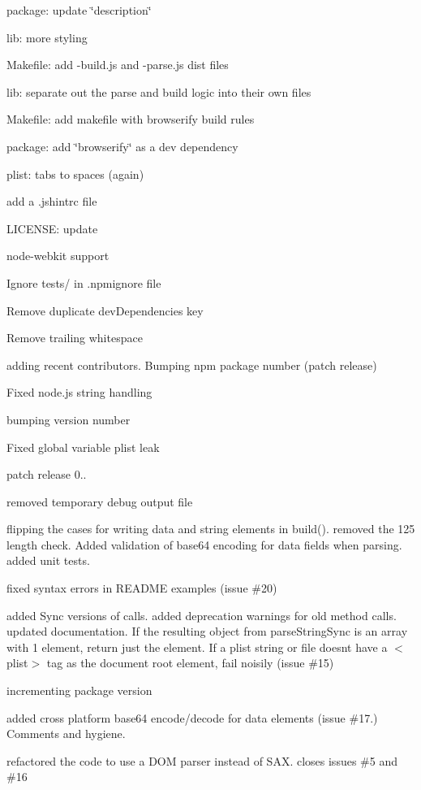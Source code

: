\begin{DoxyItemize}
\item package\+: update \char`\"{}description\char`\"{}
\item lib\+: more styling
\item Makefile\+: add -\/build.\+js and -\/parse.\+js dist files
\item lib\+: separate out the parse and build logic into their own files
\item Makefile\+: add makefile with browserify build rules
\item package\+: add \char`\"{}browserify\char`\"{} as a dev dependency
\item plist\+: tabs to spaces (again)
\item add a .jshintrc file
\item L\+I\+C\+E\+N\+SE\+: update
\item node-\/webkit support
\item Ignore tests/ in .npmignore file
\item Remove duplicate dev\+Dependencies key
\item Remove trailing whitespace
\item adding recent contributors. Bumping npm package number (patch release)
\item Fixed node.\+js string handling
\item bumping version number
\item Fixed global variable plist leak
\item patch release 0..
\item removed temporary debug output file
\item flipping the cases for writing data and string elements in build(). removed the 125 length check. Added validation of base64 encoding for data fields when parsing. added unit tests.
\item fixed syntax errors in R\+E\+A\+D\+ME examples (issue \#20)
\item added Sync versions of calls. added deprecation warnings for old method calls. updated documentation. If the resulting object from parse\+String\+Sync is an array with 1 element, return just the element. If a plist string or file doesnt have a $<$plist$>$ tag as the document root element, fail noisily (issue \#15)
\item incrementing package version
\item added cross platform base64 encode/decode for data elements (issue \#17.) Comments and hygiene.
\item refactored the code to use a D\+OM parser instead of S\+AX. closes issues \#5 and \#16

\end{DoxyItemize}
